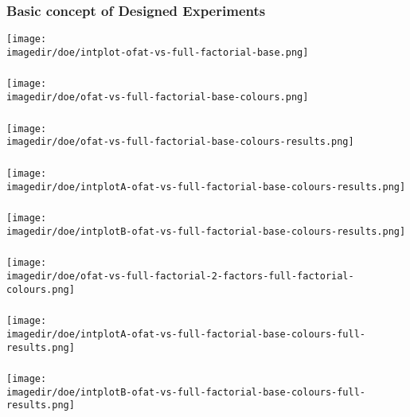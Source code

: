 \documentclass[11pt,aspectratio=169,mathserif]{beamer}
\begin{document}
\begin{frame}\frametitle{Basic concept of Designed Experiments}
	\centerline{\texttt{[image: \\imagedir/doe/intplot-ofat-vs-full-factorial-base.png]}}
\end{frame}
\begin{frame}\frametitle{}
	\centerline{\texttt{[image: \\imagedir/doe/ofat-vs-full-factorial-base-colours.png]}}
\end{frame}
\begin{frame}\frametitle{}
	\centerline{\texttt{[image: \\imagedir/doe/ofat-vs-full-factorial-base-colours-results.png]}}
\end{frame}
\begin{frame}\frametitle{}
	\centerline{\texttt{[image: \\imagedir/doe/intplotA-ofat-vs-full-factorial-base-colours-results.png]}}
\end{frame}
\begin{frame}\frametitle{}
	\centerline{\texttt{[image: \\imagedir/doe/intplotB-ofat-vs-full-factorial-base-colours-results.png]}}
\end{frame}
\begin{frame}\frametitle{}
	\centerline{\texttt{[image: \\imagedir/doe/ofat-vs-full-factorial-2-factors-full-factorial-colours.png]}}
\end{frame}
\begin{frame}\frametitle{}
	\centerline{\texttt{[image: \\imagedir/doe/intplotA-ofat-vs-full-factorial-base-colours-full-results.png]}}
\end{frame}
\begin{frame}\frametitle{}
	\centerline{\texttt{[image: \\imagedir/doe/intplotB-ofat-vs-full-factorial-base-colours-full-results.png]}}
\end{frame}
\end{document}

